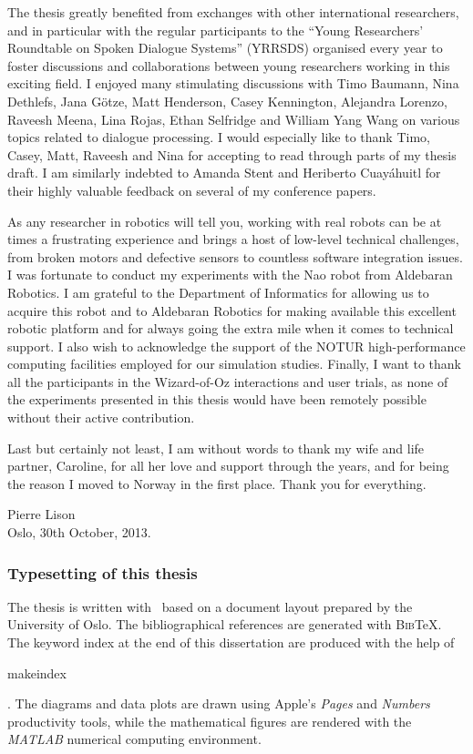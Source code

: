 The thesis greatly benefited from exchanges with other international researchers, and in particular with the regular participants to the ``Young Researchers' Roundtable on Spoken Dialogue Systems'' (YRRSDS) organised every year to foster discussions and collaborations between young researchers working in this exciting field. I enjoyed many stimulating discussions with Timo Baumann, Nina Dethlefs, Jana G\"otze,  Matt Henderson, Casey Kennington, Alejandra Lorenzo, Raveesh Meena, Lina Rojas, Ethan Selfridge and William Yang Wang on various topics related to dialogue processing.  I would especially like to thank Timo, Casey, Matt, Raveesh and Nina for accepting to read through parts of my thesis draft. I am similarly indebted to Amanda Stent and Heriberto Cuay\'{a}huitl for their highly valuable feedback on several of my conference papers.

As any researcher in robotics will tell you, working with real robots can be at times a frustrating experience and brings a host of low-level technical challenges, from broken motors and defective sensors to countless software integration issues. I was fortunate to conduct my experiments with the Nao robot from Aldebaran Robotics.  I am grateful to the Department of Informatics for allowing us to acquire this robot and to Aldebaran Robotics for making available this excellent robotic platform and for always going the extra mile when it comes to technical support. I also wish to acknowledge the support of the NOTUR high-performance computing facilities employed for our simulation studies. Finally, I want to thank all the participants in the Wizard-of-Oz interactions and user trials, as none of the experiments presented in this thesis would have been remotely possible without their active contribution.

Last but certainly not least, I am without words to thank my wife and life partner, Caroline, for all her love and support through the years, and for being the reason I moved to Norway in the first place. Thank you for everything.

\vspace{1cm}

\begin{flushright}Pierre Lison \\ Oslo, 30th October, 2013. \end{flushright}

\null 
\vfill
\begin{footnotesize}\subsubsection*{Typesetting of this thesis}
The thesis is written with \LaTeXe \ based on a document layout prepared by the University of Oslo. The bibliographical references are generated with \textsc{Bib}\negthinspace\TeX.  The keyword index at the end of this dissertation are produced with the help of \begin{scriptsize}\textsf{makeindex}\end{scriptsize}. The diagrams and data plots are drawn using Apple's \textit{Pages} and \textit{Numbers} productivity tools, while the mathematical figures are rendered with the \textit{MATLAB} numerical computing environment.\end{footnotesize}
